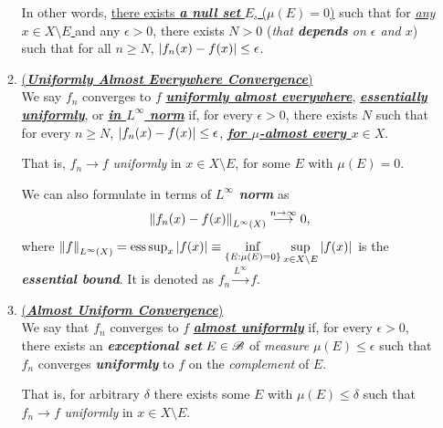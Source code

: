 \documentclass[11pt]{article}
\begin{document}
\begin{itemize}
\begin{remark}
\begin{enumerate}
\begin{definition}
In other words, \underline{there exists \emph{\textbf{a null set}} $E$, ($\mu(E) = 0$)} such that for \underline{\emph{any $x\in X \setminus E$ }} and any $\epsilon > 0$, there exists $N > 0$ (\emph{that \textbf{depends} on $\epsilon$ and $x$}) such that for all $n \ge N$, $\left\lvert f_n(x) - f(x) \right\rvert \le  \epsilon$. 
\end{definition}

\item \begin{definition}  \underline{(\emph{\textbf{Uniformly Almost Everywhere Convergence}})} \citep{tao2011introduction}\\
We say $f_n$ converges to $f$ \underline{\emph{\textbf{uniformly almost everywhere}}}, \underline{\emph{\textbf{essentially uniformly}}}, or \underline{\emph{\textbf{in $L^{\infty}$ norm}}} if, for every $\epsilon> 0$, there exists $N$ such that for every $n\ge  N$, $\left\lvert  f_n(x) - f(x) \right\rvert \le \epsilon$, \emph{\textbf{\underline{for $\mu$-almost every $x \in X$}}}. 

That is, $f_n \rightarrow f$ \emph{uniformly} in $x \in X \setminus E$, for some $E$ with $\mu(E) = 0$.

We can also formulate in terms of \emph{\textbf{$L^{\infty}$ norm}} as 
\begin{align*}
\left\|f_n(x) - f(x)\right\|_{L^{\infty}(X)} \stackrel{n\rightarrow \infty}{\longrightarrow} 0,
\end{align*}
where $\left\|f\right\|_{L^{\infty}(X)} = \text{ess}\sup_{x}\left\lvert f(x) \right\rvert \equiv\inf\limits_{\{E:\mu(E)=0\}}\sup\limits_{x\in X \setminus E}\left\lvert f(x) \right\rvert$ is the \emph{\textbf{essential bound}}. It is denoted as $f_{n}\stackrel{L^{\infty}}{\rightarrow} f$.
\end{definition}

\item \begin{definition}    \underline{(\emph{\textbf{Almost Uniform Convergence}})}  \citep{tao2011introduction}\\
We say that $f_n$ converges to $f$ \underline{\emph{\textbf{almost uniformly}}} if, for every $\epsilon > 0$, there exists an \emph{\textbf{exceptional set}} $E \in {\mathscr B}$ of \emph{measure} \underline{$\mu(E) \le \epsilon$} such that $f_n$ converges \emph{\textbf{uniformly}} to $f$ on the \emph{complement} of $E$.

That is, for arbitrary $\delta$ there exists some $E$ with $\mu(E) \le \delta$ such that $f_n \rightarrow f$ \emph{uniformly} in $x \in X \setminus E$.
\end{definition} 


\end{enumerate}
\end{remark}
\end{itemize}
\end{document}
